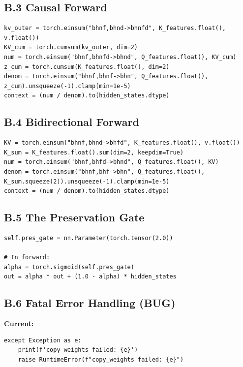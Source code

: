 \subsection{B.3 Causal Forward}

\begin{lstlisting}
kv_outer = torch.einsum("bhnf,bhnd->bhnfd", K_features.float(), v.float())
KV_cum = torch.cumsum(kv_outer, dim=2)
num = torch.einsum("bhnf,bhnfd->bhnd", Q_features.float(), KV_cum)
z_cum = torch.cumsum(K_features.float(), dim=2)
denom = torch.einsum("bhnf,bhnf->bhn", Q_features.float(), z_cum).unsqueeze(-1).clamp(min=1e-5)
context = (num / denom).to(hidden_states.dtype)
\end{lstlisting}

\subsection{B.4 Bidirectional Forward}

\begin{lstlisting}
KV = torch.einsum("bhnf,bhnd->bhfd", K_features.float(), v.float())
K_sum = K_features.float().sum(dim=2, keepdim=True)
num = torch.einsum("bhnf,bhfd->bhnd", Q_features.float(), KV)
denom = torch.einsum("bhnf,bhf->bhn", Q_features.float(), K_sum.squeeze(2)).unsqueeze(-1).clamp(min=1e-5)
context = (num / denom).to(hidden_states.dtype)
\end{lstlisting}

\subsection{B.5 The Preservation Gate}

\begin{lstlisting}
self.pres_gate = nn.Parameter(torch.tensor(2.0))

# In forward:
alpha = torch.sigmoid(self.pres_gate)
out = alpha * out + (1.0 - alpha) * hidden_states
\end{lstlisting}

\subsection{B.6 Fatal Error Handling (BUG)}

\textbf{Current:}
\begin{lstlisting}
except Exception as e:
    print(f'copy_weights failed: {e}')
    raise RuntimeError(f"copy_weights failed: {e}")
\end{lstlisting}

